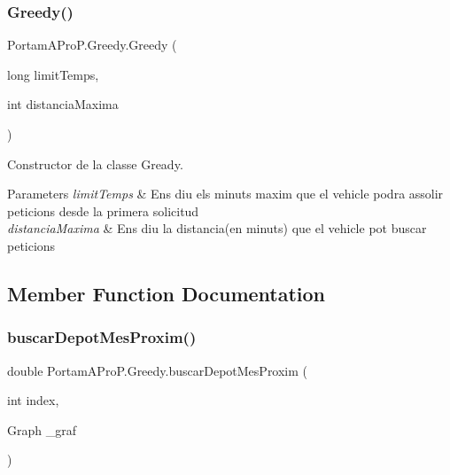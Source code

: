 \subsubsection{\texorpdfstring{Greedy()}{Greedy()}}
{\footnotesize\ttfamily Portam\+A\+Pro\+P.\+Greedy.\+Greedy (\begin{DoxyParamCaption}\item[{long}]{limit\+Temps,  }\item[{int}]{distancia\+Maxima }\end{DoxyParamCaption})}



Constructor de la classe Gready. 


\begin{DoxyParams}{Parameters}
{\em limit\+Temps} & Ens diu els minuts maxim que el vehicle podra assolir peticions desde la primera solicitud \\
\hline
{\em distancia\+Maxima} & Ens diu la distancia(en minuts) que el vehicle pot buscar peticions \\
\hline
\end{DoxyParams}


\subsection{Member Function Documentation}
\mbox{\label{class_portam_a_pro_p_1_1_greedy_a452e5f5e1fd5489666fd9687d91b89c4}} 
\subsubsection{\texorpdfstring{buscar\+Depot\+Mes\+Proxim()}{buscarDepotMesProxim()}}
{\footnotesize\ttfamily double Portam\+A\+Pro\+P.\+Greedy.\+buscar\+Depot\+Mes\+Proxim (\begin{DoxyParamCaption}\item[{int}]{index,  }\item[{Graph}]{\+\_\+graf }\end{DoxyParamCaption})}


